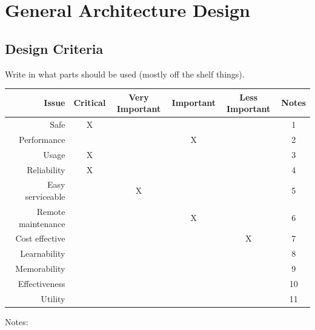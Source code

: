 \section{General Architecture Design}

\subsection{Design Criteria}
Write in what parts should be used (mostly off the shelf things).
\begin{table}[H]
	\begin{tabular}{| r | c | c | c | c | c |}
	\hline
		Issue 					& Critical 	& Very Important 	& Important	& Less Important	& Notes \\ \hline
		Safe					& X 		& ~ 				& ~			& ~ 				& 1 \\ \hline
		Performance 			& ~			& ~ 				& X 		& ~ 				& 2 \\ \hline
		Usage 					& X 		& ~ 				& ~ 		& ~ 				& 3 \\ \hline
		Reliability 			& X 		& ~ 				& ~ 		& ~ 				& 4 \\ \hline
		Easy serviceable 		& ~ 		& X 				& ~ 		& ~ 				& 5 \\ \hline
		Remote maintenance 		& ~ 		& ~ 				& X 		& ~ 				& 6 \\ \hline
		Cost effective 			& ~ 		& ~ 				& ~ 		& X 				& 7 \\ \hline
		Learnability			& ~ 		& ~ 				& ~ 		& ~ 				& 8 \\ \hline
		Memorability			& ~ 		& ~ 				& ~ 		& ~ 				& 9 \\ \hline
		Effectiveness			& ~ 		& ~ 				& ~ 		& ~ 				& 10 \\ \hline
		Utility					& ~ 		& ~ 				& ~ 		& ~ 				& 11 \\ \hline
	\end{tabular}
	\end{table}
Notes:

